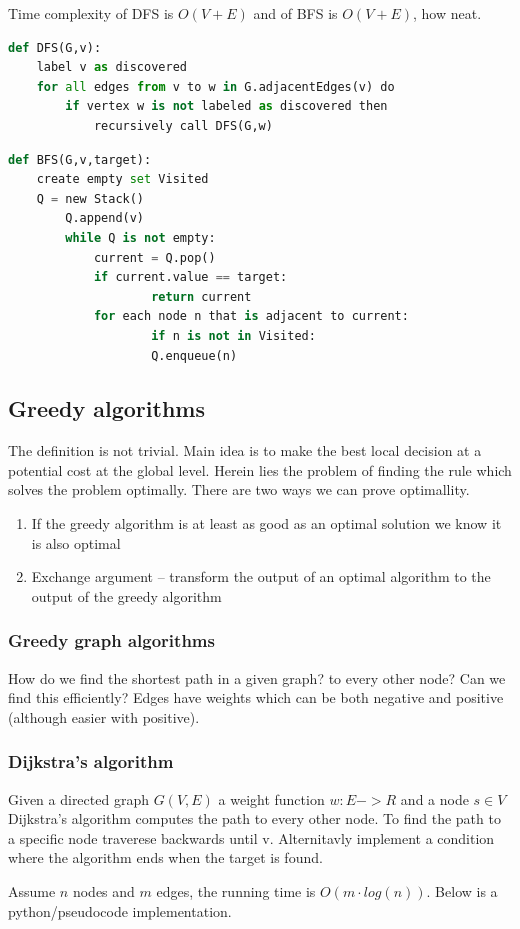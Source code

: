 \documentclass[12pt]{article} %
\begin{document}
\par Time complexity of DFS is $O(V + E)$ and of BFS is $O(V + E)$, how neat.

\begin{lstlisting}[language=Python, caption=Recursive DFS in Python]
def DFS(G,v):
    label v as discovered
    for all edges from v to w in G.adjacentEdges(v) do
        if vertex w is not labeled as discovered then
            recursively call DFS(G,w)
\end{lstlisting}

\begin{lstlisting}[language=Python, caption=BFS in Python]
def BFS(G,v,target):
    create empty set Visited
    Q = new Stack()
        Q.append(v)                      
        while Q is not empty:
            current = Q.pop()
            if current.value == target:
                    return current
            for each node n that is adjacent to current:
                    if n is not in Visited:
                    Q.enqueue(n)
\end{lstlisting}

\subsection{Greedy algorithms} %
The definition is not trivial. Main idea is to make the best local decision at a potential cost at the global level. Herein lies the problem of finding the rule which solves the problem optimally. There are two ways we can prove optimallity. 
\begin{enumerate}
\item If the greedy algorithm is at least as good as an optimal solution we know it is also optimal
\item Exchange argument -- transform the output of an optimal algorithm to the output of the greedy algorithm
\end{enumerate}

\subsubsection{Greedy graph algorithms}
How do we find the shortest path in a given graph? to every other node? Can we find this efficiently? Edges have weights which can be both negative and positive (although easier with positive).

\subsubsection{Dijkstra's algorithm}
Given a directed graph $G(V, E)$ a weight function $w: E -> R$ and a node $s \in V$ Dijkstra's algorithm computes the path to every other node. To find the path to a specific node traverese backwards until v. Alternitavly implement a condition where the algorithm ends when the target is found.
\par Assume $n$ nodes and $m$ edges, the running time is $O(m \cdot log(n))$. Below is a python/pseudocode implementation.
\end{document}
